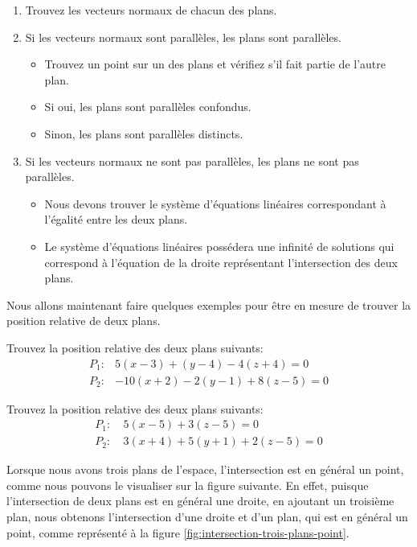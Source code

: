 \documentclass[]{book}
\providecommand{\tightlist}{%
  \setlength{\itemsep}{0pt}\setlength{\parskip}{0pt}}
\theoremstyle{definition}
\theoremstyle{definition}
\theoremstyle{definition}
\theoremstyle{remark}
\let\BeginKnitrBlock\begin \let\EndKnitrBlock\end
\begin{document}
\begin{enumerate}
\def\labelenumi{\arabic{enumi}.}
\item
  Trouvez les vecteurs normaux de chacun des plans.
\item
  Si les vecteurs normaux sont parallèles, les plans sont parallèles.

  \begin{itemize}
  \tightlist
  \item
    Trouvez un point sur un des plans et vérifiez s'il fait partie de l'autre plan.
  \item
    Si oui, les plans sont parallèles confondus.
  \item
    Sinon, les plans sont parallèles distincts.
  \end{itemize}
\item
  Si les vecteurs normaux ne sont pas parallèles, les plans ne sont pas parallèles.

  \begin{itemize}
  \tightlist
  \item
    Nous devons trouver le système d'équations linéaires correspondant à l'égalité entre les deux plans.
  \item
    Le système d'équations linéaires possédera une infinité de solutions qui correspond à l'équation de la droite représentant l'intersection des deux plans.
  \end{itemize}
\end{enumerate}

Nous allons maintenant faire quelques exemples pour être en mesure de trouver la position relative de deux plans.

\BeginKnitrBlock{example}
\protect\hypertarget{exm:unnamed-chunk-226}{}{\label{exm:unnamed-chunk-226} }Trouvez la position relative des deux plans suivants:
\begin{align*}
P_1 :& 5(x-3)+(y-4)-4(z+4) = 0 \\
P_2 :& -10(x+2)-2(y-1)+8(z-5) = 0
\end{align*}
\EndKnitrBlock{example}

\BeginKnitrBlock{example}
\protect\hypertarget{exm:unnamed-chunk-227}{}{\label{exm:unnamed-chunk-227} }Trouvez la position relative des deux plans suivants:
\begin{align*}
P_1 :& \ 5(x-5)+3(z-5) = 0 \\
P_2 :& \ 3(x+4)+5(y+1)+2(z-5) = 0
\end{align*}
\EndKnitrBlock{example}

Lorsque nous avons trois plans de l'espace, l'intersection est en général un point, comme nous pouvons le visualiser sur la figure suivante. En effet, puisque l'intersection de deux plans est en général une droite, en ajoutant un troisième plan, nous obtenons l'intersection d'une droite et d'un plan, qui est en général un point, comme représenté à la figure \ref{fig:intersection-trois-plans-point}.
\end{document}
